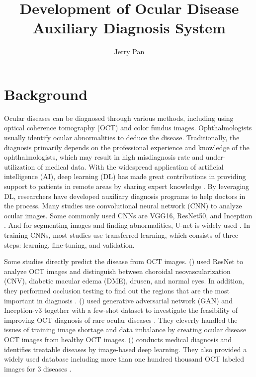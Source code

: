 \documentclass{article}
\newcommand{\authyear}[1]{\citeauthor{#1} (\citeyear{#1})}
\begin{document}
	\title{\vspace{-2.25cm} Development of Ocular Disease Auxiliary Diagnosis System}
	\author{Jerry Pan}
	\date{}
	\maketitle
	
	\vspace{0.5cm}
	\tableofcontents
	
	\pagebreak
	
	\section{Background}
	
		Ocular diseases can be diagnosed through various methods, including using optical coherence tomography (OCT) and color fundus images. Ophthalmologists usually identify ocular abnormalities to deduce the disease.  Traditionally, the diagnosis primarily depends on the professional experience and knowledge of the ophthalmologists, which may result in high misdiagnosis rate and under-utilization of medical data.  With the widespread application of artificial intelligence (AI), deep learning (DL) has made great contributions in providing support to patients in remote areas by sharing expert knowledge \autocite{Ichhpujani_Thakur_2021}.  By leveraging DL, researchers have developed auxiliary diagnosis programs to help doctors in the process. Many studies use convolutional neural network (CNN) to analyze ocular images. Some commonly used CNNs are VGG16, ResNet50, and Inception \autocite{daich2023artificial}.  And for segmenting images and finding abnormalities, U-net is widely used \autocite{Ronneberger_Fischer_Brox_2015}. In training CNNs, most studies use transferred learning, which consists of three steps: learning, fine-tuning, and validation.
		
		Some studies directly predict the disease from OCT images.
		\authyear{li2019deep} used ResNet to analyze OCT images and distinguish between choroidal neovascularization (CNV), diabetic macular edema (DME), drusen, and normal eyes. In addition, they performed occlusion testing to find out the regions that are the most important in diagnosis \autocite{li2019deep}. 
		\authyear{yoo2021feasibility} used generative adversarial network (GAN) and Inception-v3 together with a few-shot dataset to investigate the feasibility of improving OCT diagnosis of rare ocular diseases \autocite{yoo2021feasibility}.  They cleverly handled the issues of training image shortage and data imbalance by creating ocular disease OCT images from healthy OCT images. \authyear{Kermany2018} conducts medical diagnosis and identifies treatable diseases by image-based deep learning.  They also provided a widely used database including more than one hundred thousand OCT labeled images for 3 diseases \autocite{Kermany2018}.
		
\end{document}
